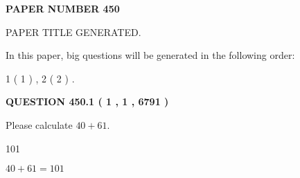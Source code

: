 \documentclass[12pt]{article}
\begin{document}
   
   
   
\newpage 
\setcounter{page}{ 
   450001 } 
   
   
   
   
 {\textbf{ \Large{ PAPER NUMBER  450  }}}
   
   
\vspace{0.2in}
   
   
   
   
   
   
   
   
 \vspace{0.2in}
 
 
 
 
   
   
 PAPER TITLE GENERATED.
   
   
   
\vspace{0.2in}
   
In this paper, big questions will be generated in the following order: 
   
   
   1 ( 1 )
 ,
   2 ( 2 )
 .
  
\vspace{0.2in}
  
{\textbf{\Large{QUESTION
450.1 
 ( 1 , 1 , 6791 )
}}}
  
  
 
Please calculate $ %
40 +  %
61 $.
 
 
 
\noindent{}
 
 

101
 
 
\noindent{}
 
 

 
 
 
\noindent{}
 
 

$ %
40 +  %
61=   %
101$
 
 
\noindent{}
 
 

 
   
   
   
\end{document}
